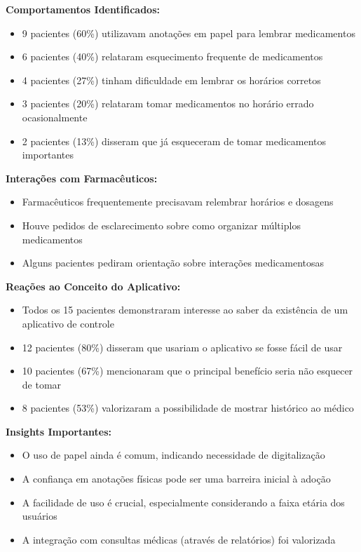 \documentclass[12pt]{article}
\begin{document}
\textbf{Comportamentos Identificados:}
\begin{itemize}
    \item 9 pacientes (60\%) utilizavam anotações em papel para lembrar medicamentos
    \item 6 pacientes (40\%) relataram esquecimento frequente de medicamentos
    \item 4 pacientes (27\%) tinham dificuldade em lembrar os horários corretos
    \item 3 pacientes (20\%) relataram tomar medicamentos no horário errado ocasionalmente
    \item 2 pacientes (13\%) disseram que já esqueceram de tomar medicamentos importantes
\end{itemize}

\textbf{Interações com Farmacêuticos:}
\begin{itemize}
    \item Farmacêuticos frequentemente precisavam relembrar horários e dosagens
    \item Houve pedidos de esclarecimento sobre como organizar múltiplos medicamentos
    \item Alguns pacientes pediram orientação sobre interações medicamentosas
\end{itemize}

\textbf{Reações ao Conceito do Aplicativo:}
\begin{itemize}
    \item Todos os 15 pacientes demonstraram interesse ao saber da existência de um aplicativo de controle
    \item 12 pacientes (80\%) disseram que usariam o aplicativo se fosse fácil de usar
    \item 10 pacientes (67\%) mencionaram que o principal benefício seria não esquecer de tomar
    \item 8 pacientes (53\%) valorizaram a possibilidade de mostrar histórico ao médico
\end{itemize}

\textbf{Insights Importantes:}
\begin{itemize}
    \item O uso de papel ainda é comum, indicando necessidade de digitalização
    \item A confiança em anotações físicas pode ser uma barreira inicial à adoção
    \item A facilidade de uso é crucial, especialmente considerando a faixa etária dos usuários
    \item A integração com consultas médicas (através de relatórios) foi valorizada
\end{itemize}
\end{document}
